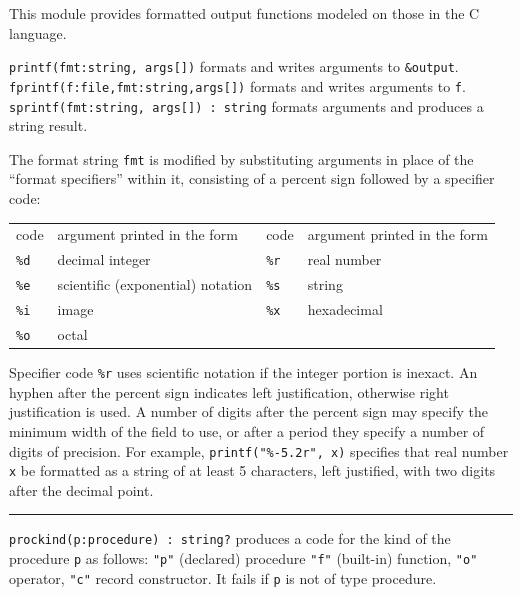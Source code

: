 This module provides formatted output functions
modeled on those in the C language.

\texttt{printf(fmt:string, args[])} formats and writes arguments to
\texttt{\&output}.\\
\texttt{fprintf(f:file,fmt:string,args[])} formats and writes arguments
to \texttt{f}.\\
\texttt{sprintf(fmt:string, args[]) : string} formats arguments and
produces a string result.

The format string \texttt{fmt} is modified by substituting arguments
in place of the ``format specifiers'' within it, consisting of a
percent sign followed by a specifier code:

\begin{xtabular}{m{0.5in} m{2.55in}m{0.5in}m{2.55in}}
code & argument printed in the form &
code & argument printed in the form \\
 \texttt{\%d}  & decimal integer        & \texttt{\%r}    & real number \\
 \texttt{\%e}  & scientific (exponential) notation & \texttt{\%s}    & string \\
 \texttt{\%i}  & image &          \texttt{\%x}    & hexadecimal \\
 \texttt{\%o}  & octal &           & \\
\end{xtabular}

Specifier code \texttt{\%r} uses scientific notation if the integer
portion is inexact.
An hyphen after the percent sign indicates left justification,
otherwise right justification is used. A number of digits after the
percent sign may specify the minimum width of the field to use, or after
a period they specify a number of digits of precision. For example,
\texttt{printf("\%-5.2r", x)} specifies that real number \texttt{x} be
formatted as a string of at least 5 characters, left justified,
with two digits after the decimal point.

\pagebreak


\vspace{0.25cm}\hrule{}

\texttt{prockind(p:procedure) : string?} produces a code for the kind of
the procedure \texttt{p} as follows: \texttt{"p"}
(declared) procedure \texttt{"f"}
(built-in) function, \texttt{"o"} operator,
\texttt{"c"} record
constructor. It fails if \texttt{p} is not of type
procedure. 

